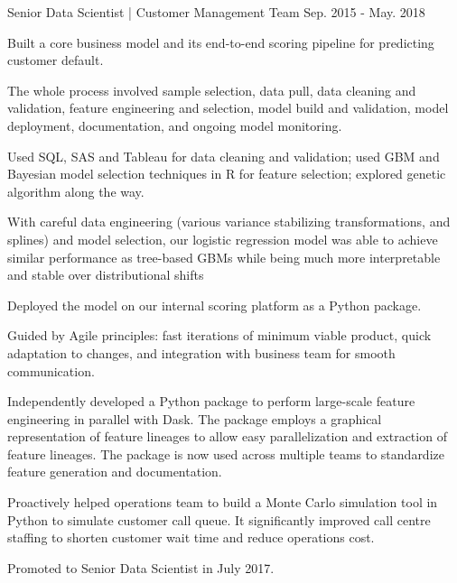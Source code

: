 \begin{cventries}
    \cventry
      {Senior Data Scientist | Customer Management Team} %
      {} %
      {} %
      {Sep. 2015 - May. 2018} %
      {
        \begin{cvitems} %
          \item {Built a core business model and its end-to-end scoring pipeline for predicting customer default.}\\
          \begin{cvitems}
            \item {The whole process involved sample selection, data pull, data cleaning and validation, feature engineering and selection, model build and validation, model deployment, documentation, and ongoing model monitoring.}
            \item {Used SQL, SAS and Tableau for data cleaning and validation; used GBM and Bayesian model selection techniques in R for feature selection; explored genetic algorithm along the way.}
            \item {With careful data engineering (various variance stabilizing transformations, and splines) and model selection, our logistic regression model was able to achieve similar performance as tree-based GBMs while being much more interpretable and stable over distributional shifts}
            \item {Deployed the model on our internal scoring platform as a Python package.}
            \item {Guided by Agile principles: fast iterations of minimum viable product, quick adaptation to changes, and integration with business team for smooth communication.}\\
          \end{cvitems}
          \item {Independently developed a Python package to perform large-scale feature engineering in parallel with Dask. The package employs a graphical representation of feature lineages to allow easy parallelization and extraction of feature lineages. The package is now used across multiple teams to standardize feature generation and documentation.}
          \item {Proactively helped operations team to build a Monte Carlo simulation tool in Python to simulate customer call queue. It significantly improved call centre staffing to shorten customer wait time and reduce operations cost.}
          \item {Promoted to Senior Data Scientist in July 2017.}
        \end{cvitems}
      }

\end{cventries}
